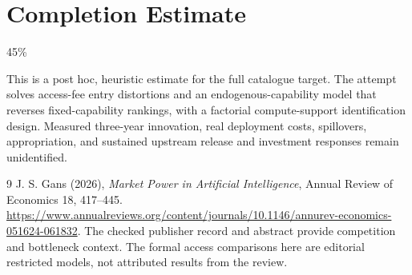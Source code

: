 \documentclass[11pt,a4paper]{article}
\begin{document}
\section{Completion Estimate}
45\%

This is a post hoc, heuristic estimate for the full catalogue target.
The attempt solves access-fee entry distortions and an endogenous-capability model that reverses fixed-capability rankings, with a factorial compute-support identification design. Measured three-year innovation, real deployment costs, spillovers, appropriation, and sustained upstream release and investment responses remain unidentified.

\begin{thebibliography}{9}
 J. S. Gans (2026), \emph{Market Power in Artificial Intelligence}, Annual Review of Economics 18, 417--445. \url{https://www.annualreviews.org/content/journals/10.1146/annurev-economics-051624-061832}. The checked publisher record and abstract provide competition and bottleneck context. The formal access comparisons here are editorial restricted models, not attributed results from the review.
\end{thebibliography}
\end{document}

